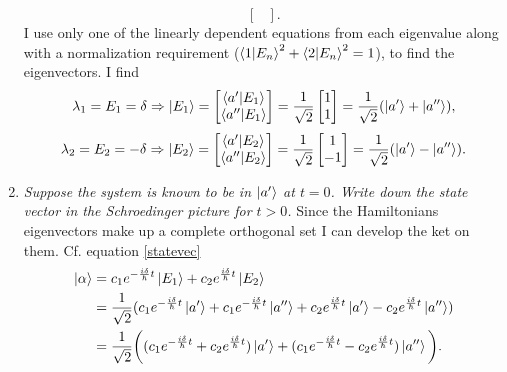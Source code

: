 \begin{example}
\begin{enumerate}
\begin{equation}
\begin{bmatrix}
			\end{bmatrix}.
		\end{equation} 
		I use only one of the linearly dependent equations from each eigenvalue along with a normalization requirement ($\braket{1|E_n}^2+\braket{2|E_n}^2=1$), to find the eigenvectors. I find
		\begin{equation}
			\lambda_1=E_1=\delta\Rightarrow
			\ket{E_1}=\begin{bmatrix}
				\braket{a'|E_1}\\
				\braket{a''|E_1}\\
			\end{bmatrix}=\frac{1}{\sqrt{2}}\begin{bmatrix}
				1\\
				1\\
			\end{bmatrix}=\frac{1}{\sqrt{2}}(\ket{a'}+\ket{a''}),
		\end{equation} 
		\begin{equation}
			\lambda_2=E_2=-\delta\Rightarrow
			\ket{E_2}=\begin{bmatrix}
				\braket{a'|E_2}\\
				\braket{a''|E_2}\\
			\end{bmatrix}=\frac{1}{\sqrt{2}}\begin{bmatrix}
				1\\
				-1\\
			\end{bmatrix}=\frac{1}{\sqrt{2}}(\ket{a'}-\ket{a''}).
		\end{equation} 
		\item \emph{Suppose the system is known to be in $\ket{a'}$ at $t=0$. Write down the state vector in the Schroedinger picture for $t>0$.}\newline
		Since the Hamiltonians eigenvectors make up a complete orthogonal set I can develop the ket on them. Cf. equation \eqref{statevec}
		\begin{equation}
			\begin{split}
				\ket{\alpha}&=c_1e^{-\frac{i\delta}{\hbar}t}\ket{E_1}+c_2e^{\frac{i\delta}{\hbar}t}\ket{E_2}\\
				&=\frac{1}{\sqrt{2}}(c_1e^{-\frac{i\delta}{\hbar}t}\ket{a'}+c_1e^{-\frac{i\delta}{\hbar}t}\ket{a''}+c_2e^{\frac{i\delta}{\hbar}t}\ket{a'}-c_2e^{\frac{i\delta}{\hbar}t}\ket{a''})\\
				&=\frac{1}{\sqrt{2}}\bigg((c_1e^{-\frac{i\delta}{\hbar}t}+c_2e^{\frac{i\delta}{\hbar}t})\ket{a'}+(c_1e^{-\frac{i\delta}{\hbar}t}-c_2e^{\frac{i\delta}{\hbar}t})\ket{a''}\bigg).\\

\end{split}
\end{equation}
\end{enumerate}
\end{example}
